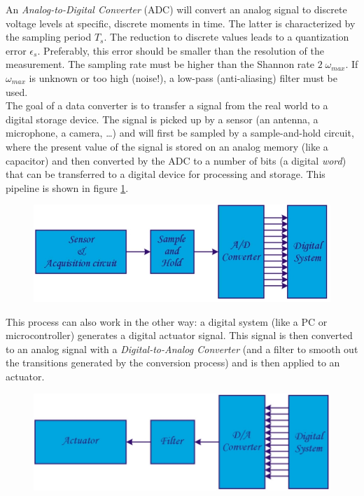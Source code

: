 An \emph{Analog-to-Digital Converter} (ADC) will convert an analog signal to discrete voltage levels at specific, discrete moments in time. The latter is characterized by the sampling period $T_s$. The reduction to discrete values leads to a quantization error $\epsilon_s$. Preferably, this error should be smaller than the resolution of the measurement. The sampling rate must be higher than the Shannon rate $2 \; \omega_{max}$. If $\omega_{max}$ is unknown or too high (noise!), a low-pass (anti-aliasing) filter must be used.\\
The goal of a data converter is to transfer a signal from the real world to a digital storage device. The signal is picked up by a sensor (an antenna, a microphone, a camera, \ldots ) and will first be sampled by a sample-and-hold circuit, where the present value of the signal is stored on an analog memory (like a capacitor) and then converted by the ADC to a number of bits (a digital \emph{word}) that can be transferred to a digital device for processing and storage. This pipeline is shown in figure \ref{fig:intro2}.\\
\begin{figure}[h!]
	\centering
	\includegraphics[width=12cm]{figures/ch18/intro2.jpg}
	\caption{}
	\label{fig:intro2}
\end{figure}
This process can also work in the other way: a digital system (like a PC or microcontroller) generates a digital actuator signal. This signal is then converted to an analog signal with a \emph{Digital-to-Analog Converter} (and a filter to smooth out the transitions generated by the conversion process) and is then applied to an actuator.
\begin{figure}[h!]
	\centering
	\includegraphics[width=12cm]{figures/ch18/intro3.jpg}
	\caption{}
	\label{fig:intro3}
\end{figure}

